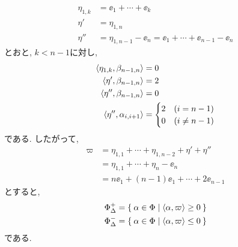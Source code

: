 \begin{align*}
  \eta_{1,k}&=\ee_1+\cdots+\ee_k\\
  \eta'&=\eta_{1,n}\\
  \eta''&=\eta_{1,n-1}-\ee_n=\ee_1+\cdots+\ee_{n-1}-\ee_n
\end{align*}
とおと, $k<n-1$に対し,
\begin{align*}
  \Braket{\eta_{1,k},\beta_{n-1,n}}&=0\\
  \Braket{\eta',\beta_{n-1,n}}&=2\\
  \Braket{\eta'',\beta_{n-1,n}}&=0\\
  \Braket{\eta'',\alpha_{i,i+1}}&=
  \begin{cases}
    2 &(i=n-1)\\
    0 &(i\neq n-1)
  \end{cases}
\end{align*}
である.
したがって,
\begin{align*}
  \varpi&=\eta_{1,1}+\cdots+\eta_{1,n-2}+\eta'+\eta''\\
  &=\eta_{1,1}+\cdots+\eta_{n}-\ee_n\\
  &=n\ee_1+(n-1)\ee_1+\cdots+2\ee_{n-1}
\end{align*}
  とすると,
\begin{align*}
\Phi_\Delta^+&=\Set{\alpha\in\Phi|\Braket{\alpha,\varpi}\geq 0}\\
\Phi_\Delta^-&=\Set{\alpha\in\Phi|\Braket{\alpha,\varpi}\leq 0}
\end{align*}
である.


